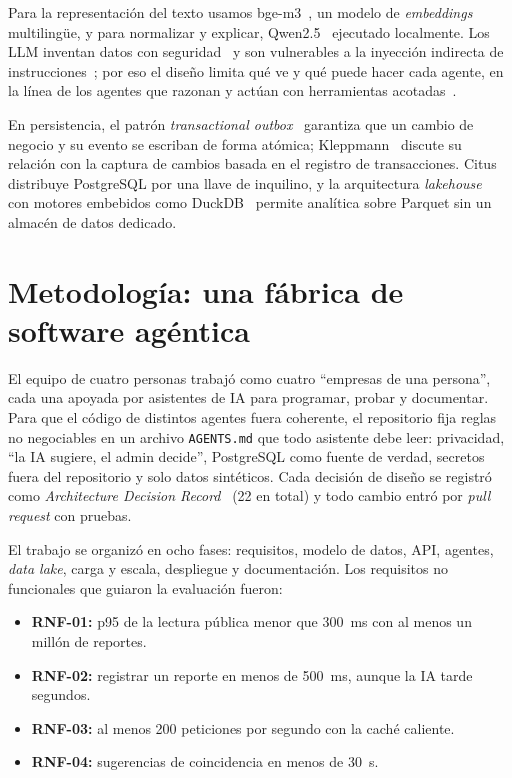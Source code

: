\documentclass[conference]{IEEEtran}
\begin{document}
Para la representación del texto usamos bge-m3~\cite{chen2024bgem3}, un modelo de \emph{embeddings} multilingüe, y para normalizar y explicar, Qwen2.5~\cite{qwen2024} ejecutado localmente. Los LLM inventan datos con seguridad~\cite{ji2023hallucination} y son vulnerables a la inyección indirecta de instrucciones~\cite{greshake2023}; por eso el diseño limita qué ve y qué puede hacer cada agente, en la línea de los agentes que razonan y actúan con herramientas acotadas~\cite{yao2023react}.

En persistencia, el patrón \emph{transactional outbox}~\cite{richardson2018} garantiza que un cambio de negocio y su evento se escriban de forma atómica; Kleppmann~\cite{kleppmann2017} discute su relación con la captura de cambios basada en el registro de transacciones. Citus~\cite{cubukcu2021citus} distribuye PostgreSQL por una llave de inquilino, y la arquitectura \emph{lakehouse}~\cite{armbrust2021lakehouse} con motores embebidos como DuckDB~\cite{raasveldt2019duckdb} permite analítica sobre Parquet sin un almacén de datos dedicado.

\section{Metodología: una fábrica de software agéntica}

El equipo de cuatro personas trabajó como cuatro ``empresas de una persona'', cada una apoyada por asistentes de IA para programar, probar y documentar. Para que el código de distintos agentes fuera coherente, el repositorio fija reglas no negociables en un archivo \texttt{AGENTS.md} que todo asistente debe leer: privacidad, ``la IA sugiere, el admin decide'', PostgreSQL como fuente de verdad, secretos fuera del repositorio y solo datos sintéticos. Cada decisión de diseño se registró como \emph{Architecture Decision Record}~\cite{nygard2011adr} (22 en total) y todo cambio entró por \emph{pull request} con pruebas.

El trabajo se organizó en ocho fases: requisitos, modelo de datos, API, agentes, \emph{data lake}, carga y escala, despliegue y documentación. Los requisitos no funcionales que guiaron la evaluación fueron:
\begin{itemize}
  \item \textbf{RNF-01:} p95 de la lectura pública menor que 300~ms con al menos un millón de reportes.
  \item \textbf{RNF-02:} registrar un reporte en menos de 500~ms, aunque la IA tarde segundos.
  \item \textbf{RNF-03:} al menos 200 peticiones por segundo con la caché caliente.
  \item \textbf{RNF-04:} sugerencias de coincidencia en menos de 30~s.
\end{itemize}
\end{document}
